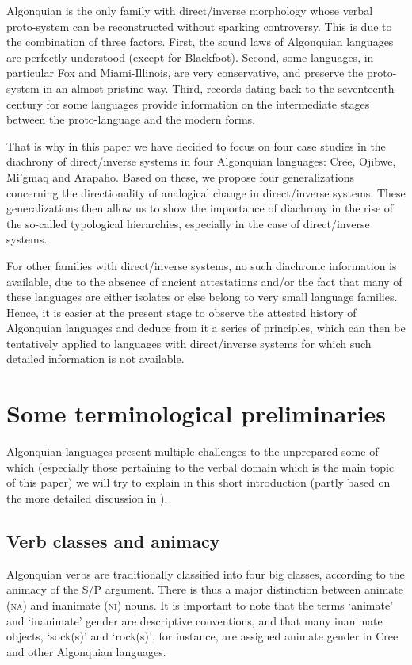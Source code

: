 \documentclass[twoside,a4paper,11pt]{article}
\newcommand{\Σ}{\greek{Σ}}
\newcommand{\nanim}{\textsc{na}}
\newcommand{\ninan}{\textsc{ni}}
\begin{document}
Algonquian is the only family with direct/inverse morphology whose verbal proto-system can be reconstructed without sparking controversy. This is due to the combination of three factors. First, the sound laws of Algonquian languages are perfectly understood (except for Blackfoot). Second, some languages, in particular Fox and Miami-Illinois, are very conservative, and preserve the proto-system in an almost pristine way. Third, records dating back to the seventeenth century for some languages provide information on the intermediate stages between the proto-language and the modern forms.
 
That is why in this paper we have decided to focus on four case studies in the diachrony of direct/inverse systems in four Algonquian languages: Cree, Ojibwe, Mi'gmaq and Arapaho. Based on these, we propose four generalizations concerning the directionality of analogical change in direct/inverse systems. These generalizations then allow us to show the importance of diachrony in the rise of the so-called typological hierarchies, especially in the case of direct/inverse systems.

For other families with direct/inverse systems, no such diachronic information is available, due to the absence of ancient attestations and/or the fact that many of these languages are either isolates or else belong to very small language families. Hence, it is easier at the present stage to observe the attested history of Algonquian languages and deduce from it a series of principles, which can then be tentatively applied to languages with direct/inverse systems for which such detailed information is not available. 

\section{Some terminological preliminaries}

Algonquian languages present multiple challenges to the unprepared some of which (especially those pertaining to the verbal domain which is the main topic of this paper) we will try to explain in this short introduction (partly based on the more detailed discussion in \citealp{jacques14inverse}).

\subsection{Verb classes and animacy}

Algonquian verbs are traditionally classified into four big classes, according to the animacy of the S/P argument. There is thus a major distinction between animate (\nanim) and inanimate (\ninan) nouns. It is important to note that the terms `animate' and `inanimate' gender are descriptive conventions, and that many inanimate objects, `sock(s)' and `rock(s)', for instance, are assigned animate gender in Cree and other Algonquian languages.
\end{document}
